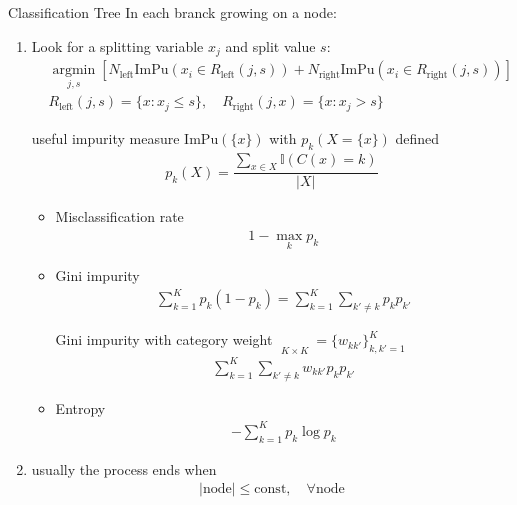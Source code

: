 \begin{algorithm}{Classification Tree}
    In each branck growing on a node:
    \begin{enumerate}[topsep=2pt,itemsep=2pt]
        \item Look for a splitting variable $ x_j $ and split value $ s $:
        \begin{align}
            &\mathop{\arg\min}\limits_{j,s}\left[N_\mathrm{left} \mathrm{ImPu}(x_i\in R_\mathrm{left}(j,s) )+N_\mathrm{right} \mathrm{ImPu}(x_i\in R_\mathrm{right}(j,s) )  \right] \\
            &R_\mathrm{left}(j,s)=\{x:x_j\leq s\},\quad R_\mathrm{right}(j,x)=\{x:x_j>s\}   
        \end{align}
        
        useful impurity measure $ \mathrm{ImPu}(\{x\})  $ with $ p_k(X=\{x\})$ defined
        \begin{align}
            p_k(X)=\dfrac{\sum_{x\in X}\mathbb{I}(C(x)=k)}{|X|}
        \end{align}
        
        
        \begin{itemize}[topsep=2pt,itemsep=0pt]
            \item Misclassification rate
            \begin{align}
                1-\mathop{\max}\limits_{k} p_k 
            \end{align}
            \item Gini impurity
            \begin{align}
                \sum_{k=1}^Kp_k(1-p_k)=\sum_{k=1}^K\sum_{k'\neq k}p_kp_{k'} 
            \end{align}
            
            Gini impurity with category weight $ \mathop{W_K}\limits_{K\times K}=\{w_{kk'}\}_{k,k'=1}^K  $
            \begin{align}
                \sum_{k=1}^K\sum_{k'\neq k}w_{kk'}p_kp_{k'} 
            \end{align}
            
            \item Entropy
            \begin{align}
                -\sum_{k=1}^Kp_k\log p_k 
            \end{align}
            
            
            
            
        \end{itemize}
        \item usually the process ends when 
        \begin{align}
            |\mathrm{node} |\leq \mathrm{const},\quad \forall \mathrm{node}  
        \end{align}
        

\end{enumerate}
\end{algorithm}
